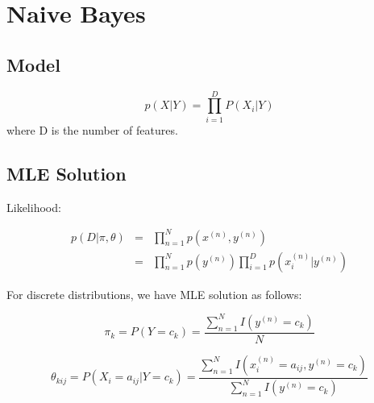 \chapter{Naive Bayes}
\label{chap:Naive Bayes}

\section{Model}

\begin{equation}
p(X|Y)=\prod_{i=1}^D P(X_i|Y)
\end{equation}
where D is the number of features.

\section{MLE Solution}

Likelihood:

\begin{eqnarray*}
p(D | \pi, \theta)  & =& \prod_{n=1}^N p(x^{(n)}, y^{(n)})\\
      & =& \prod_{n=1}^N p(y^{(n)})\prod_{i=1}^D p(x^{(n)}_i |y^{(n)})
\end{eqnarray*}

For discrete distributions, we have MLE solution as follows:

\begin{equation}
\pi_k = P(Y=c_k) = \frac{\sum_{n=1}^N \textit{I}(y^{(n)}=c_k)}{N}
\end{equation}

\begin{equation}
\theta_{kij} = P(X_i=a_{ij} | Y=c_k) = \frac{\sum_{n=1}^N \textit{I} (x^{(n)}_i=a_{ij}, y^{(n)}=c_k)}{\sum_{n=1}^N \textit{I} (y^{(n)}=c_k)}
\end{equation} 